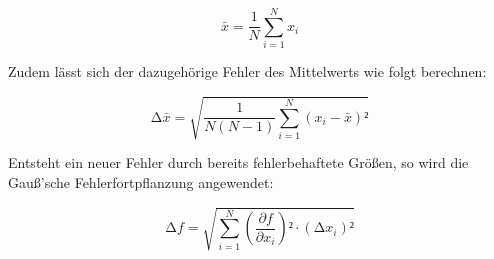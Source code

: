 \begin{equation}
\label{eqn:Mittelwert}
    \bar{x} = \frac{1}{N}\sum_{i=1}^N x_i
\end{equation}

Zudem lässt sich der dazugehörige Fehler des Mittelwerts wie folgt berechnen:

\begin{equation}
\label{eqn:Mittelwertfehler}
    \increment \bar{x} = \sqrt{\frac{1}{N\left(N-1\right)}\sum_{i=1}^N \left(x_i - \bar{x}\right)²}
\end{equation}

Entsteht ein neuer Fehler durch bereits fehlerbehaftete Größen, so wird die Gauß'sche Fehlerfortpflanzung angewendet:

\begin{equation}
    \increment f = \sqrt{\sum_{i=1}^N \left(\frac{\partial f}{\partial x_i}\right)²\cdot\left(\increment x_i\right)²}
\end{equation}




